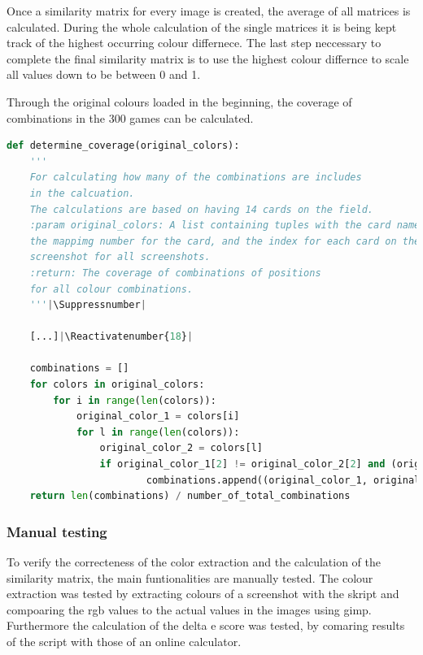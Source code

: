 %	
Once a similarity matrix for every image is created, the average of all matrices is calculated. During the whole calculation of the single matrices it is being kept track of the highest occurring colour differnece. The last step neccessary to complete the final similarity matrix is to use the highest colour differnce to scale all values down to be between 0 and 1. 

Through the original colours loaded in the beginning, the coverage of combinations in the 300 games can be calculated. 
\begin{lstlisting}[language=python, caption=Add caption]
def determine_coverage(original_colors):
	'''
 	For calculating how many of the combinations are includes 
	in the calcuation. 
	The calculations are based on having 14 cards on the field.
	:param original_colors: A list containing tuples with the card name, 
	the mappimg number for the card, and the index for each card on the 
	screenshot for all screenshots.
	:return: The coverage of combinations of positions 
	for all colour combinations. 
	'''|\Suppressnumber|
	
	[...]|\Reactivatenumber{18}|
	
	combinations = []
	for colors in original_colors:
		for i in range(len(colors)):
			original_color_1 = colors[i]
			for l in range(len(colors)):
				original_color_2 = colors[l]
				if original_color_1[2] != original_color_2[2] and (original_color_2, original_color_1) not in combinations and (original_color_1, original_color_2) not in combinations:
						combinations.append((original_color_1, original_color_2))    
	return len(combinations) / number_of_total_combinations
\end{lstlisting}

\subsubsection{Manual testing}
To verify the correcteness of the color extraction and the calculation of the similarity matrix, the main funtionalities are manually tested. The colour extraction was tested by extracting colours of a screenshot with the skript and compoaring the rgb values to the actual values in the images using gimp. Furthermore the calculation of the delta e score was tested, by comaring results of the script with those of an online calculator. 

